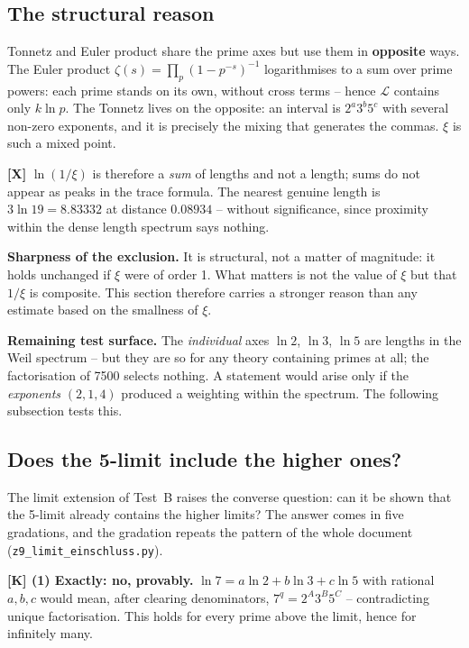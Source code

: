 \subsection{The structural reason}

\begin{keyresult}
Tonnetz and Euler product share the prime axes but use them in
\textbf{opposite} ways. The Euler product
$\zeta(s) = \prod_p (1-p^{-s})^{-1}$ logarithmises to a sum over prime
powers: each prime stands on its own, without cross terms -- hence
$\mathcal{L}$ contains only $k\ln p$. The Tonnetz lives on the
opposite: an interval is $2^a 3^b 5^c$ with several non-zero exponents,
and it is precisely the mixing that generates the commas. $\xi$ is such
a mixed point.
\end{keyresult}

\textbf{[X]} $\ln(1/\xi)$ is therefore a \emph{sum} of lengths and not a
length; sums do not appear as peaks in the trace formula. The nearest
genuine length is $3\ln 19 = 8.83332$ at distance $0.08934$ -- without
significance, since proximity within the dense length spectrum says
nothing.

\textbf{Sharpness of the exclusion.} It is structural, not a matter of
magnitude: it holds unchanged if $\xi$ were of order 1. What matters is
not the value of $\xi$ but that $1/\xi$ is composite. This section
therefore carries a stronger reason than any estimate based on the
smallness of $\xi$.

\textbf{Remaining test surface.} The \emph{individual} axes $\ln 2$,
$\ln 3$, $\ln 5$ are lengths in the Weil spectrum -- but they are so for
any theory containing primes at all; the factorisation of 7500 selects
nothing. A statement would arise only if the \emph{exponents} $(2,1,4)$
produced a weighting within the spectrum. The following subsection
tests this.

\subsection{Does the 5-limit include the higher ones?}
\label{sec:einschluss}

The limit extension of Test~B raises the converse question: can it be
shown that the 5-limit already contains the higher limits? The answer
comes in five gradations, and the gradation repeats the pattern of the
whole document (\texttt{z9\_limit\_einschluss.py}).

\textbf{[K] (1) Exactly: no, provably.} $\ln 7 = a\ln2 + b\ln3 +
c\ln5$ with rational $a,b,c$ would mean, after clearing denominators,
$7^q = 2^A 3^B 5^C$ -- contradicting unique factorisation. This holds
for every prime above the limit, hence for infinitely many.

